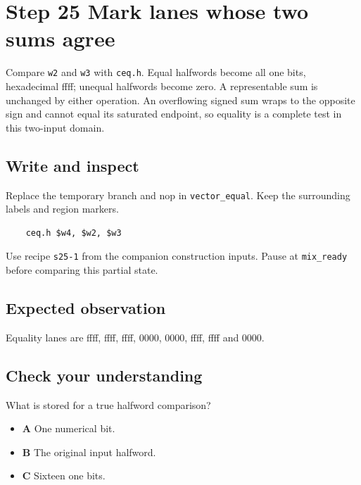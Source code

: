 \section{Step 25 Mark lanes whose two sums agree}\label{pcm-s25}

Compare \texttt{w2} and \texttt{w3} with \texttt{ceq.h}. Equal halfwords become all one bits, hexadecimal ffff; unequal halfwords become zero. A representable sum is unchanged by either operation. An overflowing signed sum wraps to the opposite sign and cannot equal its saturated endpoint, so equality is a complete test in this two-input domain.

\subsection{Write and inspect}
Replace the temporary branch and nop in \texttt{vector\_equal}. Keep the surrounding labels and region markers.

\begin{verbatim}
    ceq.h $w4, $w2, $w3
\end{verbatim}
Use recipe \texttt{s25-1} from the companion construction inputs. Pause at \texttt{mix\_ready} before comparing this partial state.

\subsection{Expected observation}
Equality lanes are ffff, ffff, ffff, 0000, 0000, ffff, ffff and 0000.

\subsection{Check your understanding}
What is stored for a true halfword comparison?

\begin{itemize}
  \item \textbf{A} One numerical bit.
  \item \textbf{B} The original input halfword.
  \item \textbf{C} Sixteen one bits.
\end{itemize}
